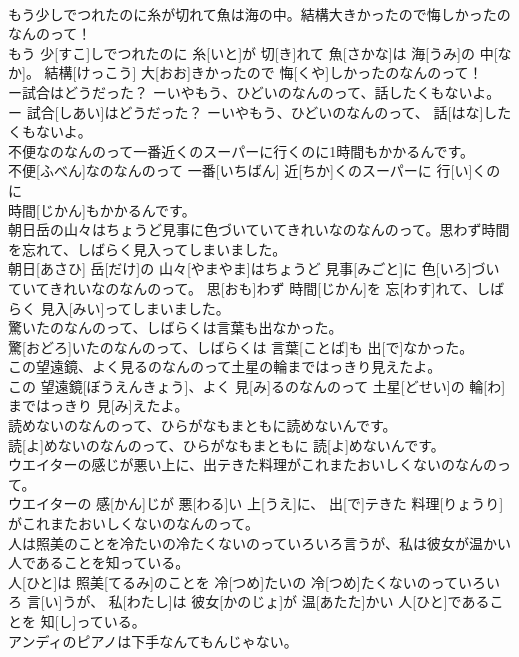 \documentclass[8pt]{extreport}
\begin{document}
\begin{CJK}{UTF8}{min}
\\	もう少しでつれたのに糸が切れて魚は海の中。結構大きかったので悔しかったのなんのって！	
\\	もう 少[すこ]しでつれたのに 糸[いと]が 切[き]れて 魚[さかな]は 海[うみ]の 中[なか]。 結構[けっこう] 大[おお]きかったので 悔[くや]しかったのなんのって！
\\	ー試合はどうだった？ ーいやもう、ひどいのなんのって、話したくもないよ。	
\\	ー 試合[しあい]はどうだった？ ーいやもう、ひどいのなんのって、 話[はな]したくもないよ。
\\	不便なのなんのって一番近くのスーパーに行くのに1時間もかかるんです。	
\\	不便[ふべん]なのなんのって 一番[いちばん] 近[ちか]くのスーパーに 行[い]くのに 
\\	時間[じかん]もかかるんです。
\\	朝日岳の山々はちょうど見事に色づいていてきれいなのなんのって。思わず時間を忘れて、しばらく見入ってしまいました。	
\\	朝日[あさひ] 岳[だけ]の 山々[やまやま]はちょうど 見事[みごと]に 色[いろ]づいていてきれいなのなんのって。 思[おも]わず 時間[じかん]を 忘[わす]れて、しばらく 見入[みい]ってしまいました。
\\	驚いたのなんのって、しばらくは言葉も出なかった。	
\\	驚[おどろ]いたのなんのって、しばらくは 言葉[ことば]も 出[で]なかった。
\\	この望遠鏡、よく見るのなんのって土星の輪まではっきり見えたよ。	
\\	この 望遠鏡[ぼうえんきょう]、よく 見[み]るのなんのって 土星[どせい]の 輪[わ]まではっきり 見[み]えたよ。
\\	読めないのなんのって、ひらがなもまともに読めないんです。	
\\	読[よ]めないのなんのって、ひらがなもまともに 読[よ]めないんです。
\\	ウエイターの感じが悪い上に、出テきた料理がこれまたおいしくないのなんのって。	
\\	ウエイターの 感[かん]じが 悪[わる]い 上[うえ]に、 出[で]テきた 料理[りょうり]がこれまたおいしくないのなんのって。
\\	人は照美のことを冷たいの冷たくないのっていろいろ言うが、私は彼女が温かい人であることを知っている。	
\\	人[ひと]は 照美[てるみ]のことを 冷[つめ]たいの 冷[つめ]たくないのっていろいろ 言[い]うが、 私[わたし]は 彼女[かのじょ]が 温[あたた]かい 人[ひと]であることを 知[し]っている。
\\	アンディのピアノは下手なんてもんじゃない。	

\end{CJK}
\end{document}
